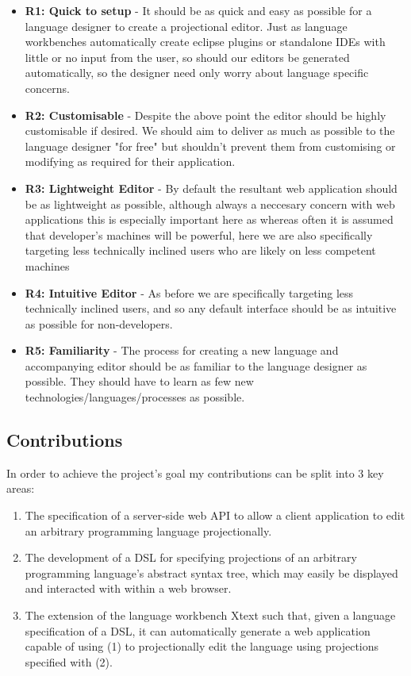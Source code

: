 \documentclass{article}
\begin{document}
\begin{itemize}
\item{\textbf{R1: Quick to setup} - It should be as quick and easy as possible for a language designer to create a projectional editor. Just as language workbenches automatically create eclipse plugins or standalone IDEs with little or no input from the user, so should our editors be generated automatically, so the designer need only worry about language specific concerns.}
\item{\textbf{R2: Customisable} - Despite the above point the editor should be highly customisable if desired. We should aim to deliver as much as possible to the language designer "for free" but shouldn't prevent them from customising or modifying as required for their application. }
\item{\textbf{R3: Lightweight Editor} - By default the resultant web application should be as lightweight as possible, although always a neccesary concern with web applications this is especially important here as whereas often it is assumed that developer's machines will be powerful, here we are also specifically targeting less technically inclined users who are likely on less competent machines}
\item{\textbf{R4: Intuitive Editor} - As before we are specifically targeting less technically inclined users, and so any default interface should be as intuitive as possible for non-developers.}
\item{\textbf{R5: Familiarity} - The process for creating a new language and accompanying editor should be as familiar to the language designer as possible. They should have to learn as few new technologies/languages/processes as possible.}
\end{itemize}

\subsection{Contributions}

In order to achieve the project's goal my contributions can be split into 3 key areas:

\begin{enumerate}
\item The specification of a server-side web API to allow a client application to edit an arbitrary programming language projectionally.
\item The development of a DSL for specifying projections of an arbitrary programming language's abstract syntax tree, which may easily be displayed and interacted with within a web browser.
\item The extension of the language workbench Xtext such that, given a language specification of a DSL, it can automatically generate a web application capable of using (1) to projectionally edit the language using projections specified with (2).
\end{enumerate}
\end{document}

